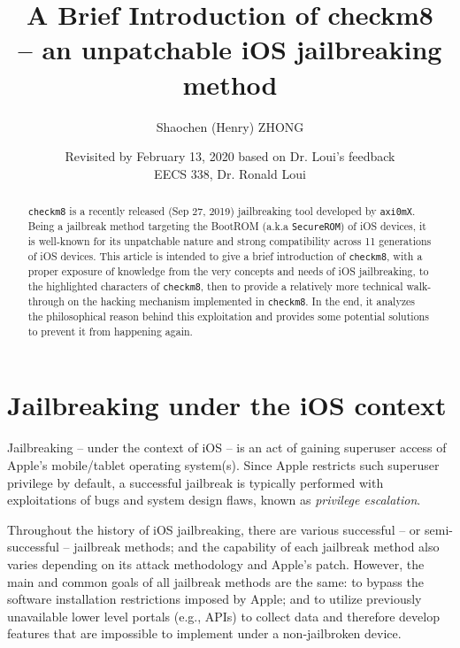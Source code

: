 \documentclass[10pt]{article}
\newcommand{\inlinecode}{\texttt}
\begin{document}
\linespread{1}


\title{\textbf{A Brief Introduction of checkm8} \\
        \large \textbf{-- an unpatchable iOS jailbreaking method\\}}

\author{Shaochen (Henry) ZHONG}
\date{Revisited by February 13, 2020 based on Dr. Loui's feedback   \\EECS 338, Dr. Ronald Loui}
\maketitle

\begin{abstract}
    \inlinecode{checkm8} is a recently released (Sep 27, 2019) jailbreaking tool developed by \inlinecode{axi0mX}. Being a jailbreak method targeting the BootROM (a.k.a \inlinecode{SecureROM}) of iOS devices, it is well-known for its unpatchable nature and strong compatibility across 11 generations of iOS devices. This article is intended to give a brief introduction of \inlinecode{checkm8}, with a proper exposure of knowledge from the very concepts and needs of iOS jailbreaking, to the highlighted characters of \inlinecode{checkm8}, then to provide a relatively more technical walk-through on the hacking mechanism implemented in \inlinecode{checkm8}. In the end, it analyzes the philosophical reason behind this exploitation and provides some potential solutions to prevent it from happening again.
\end{abstract}





\vspace{0.5cm}
{\hypersetup{hidelinks}
\tableofcontents
}


\newpage

\section{Jailbreaking under the iOS context}

Jailbreaking -- under the context of iOS -- is an act of gaining superuser access of Apple's mobile/tablet operating system(s). Since Apple restricts such superuser privilege by default, a successful jailbreak is typically performed with exploitations of bugs and system design flaws, known as \textit{privilege escalation}.

Throughout the history of iOS jailbreaking, there are various successful -- or semi-successful -- jailbreak methods; and the capability of each jailbreak method also varies depending on its attack methodology and Apple's patch. However, the main and common goals of all jailbreak methods are the same: to bypass the software installation restrictions imposed by Apple; and to utilize previously unavailable lower level portals (e.g., APIs) to collect data and therefore develop features that are impossible to implement under a non-jailbroken device.
\end{document}
